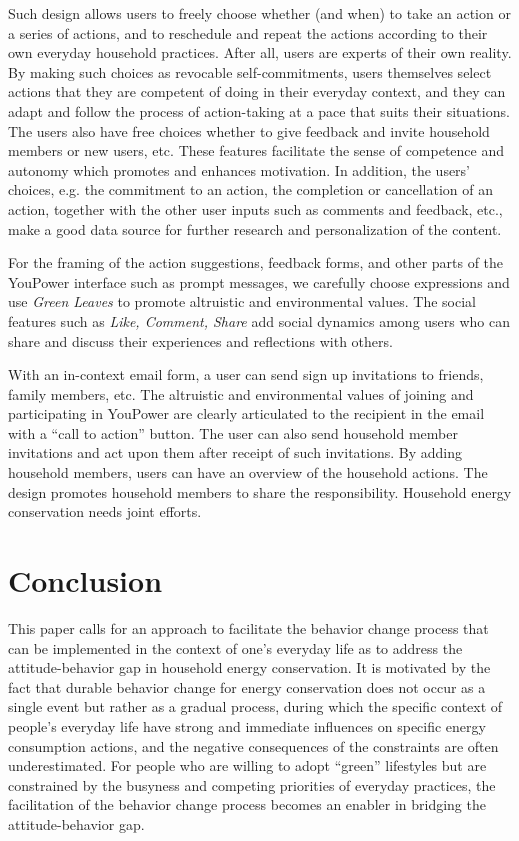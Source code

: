 \documentclass[a4paper]{article}
\begin{document}
Such design allows users to freely choose whether (and when) to take an action or a series of actions, and to reschedule and repeat the actions according to their own everyday household practices. After all, users are experts of their own reality. By making such choices as revocable self-commitments, users themselves select actions that they are competent of doing in their everyday context, and they can adapt and follow the process of action-taking at a pace that suits their situations. The users also have free choices whether to give feedback and invite household members or new users, etc. These features facilitate the sense of competence and autonomy which promotes and enhances motivation. In addition, the users' choices, e.g. the commitment to an action, the completion or cancellation of an action, together with the other user inputs such as comments and feedback, etc., make a good data source for further research and personalization of the content. 

For the framing of the action suggestions, feedback forms, and other parts of the YouPower interface such as prompt messages, we carefully choose expressions and use \textit{Green Leaves} to promote altruistic and environmental values. The social features such as \textit{Like, Comment, Share} add social dynamics among users who can share and discuss their experiences and reflections with others. 

With an in-context email form, a user can send sign up invitations to friends, family members, etc. The altruistic and environmental values of joining and participating in YouPower are clearly articulated to the recipient in the email with a ``call to action'' \citep{Crumlish2009} button. The user can also send household member invitations and act upon them after receipt of such invitations. By adding household members, users can have an overview of the household actions. The design promotes household members to share the responsibility. Household energy conservation needs joint efforts. 

\section{Conclusion}
\label{sec:conclusion}

This paper calls for an approach to facilitate the behavior change process that can be implemented in the context of one's everyday life as to address the attitude-behavior gap in household energy conservation. It is motivated by the fact that durable behavior change for energy conservation does not occur as a single event but rather as a gradual process, during which the specific context of people's everyday life have strong and immediate influences on specific energy consumption actions, and the negative consequences of the constraints are often underestimated. For people who are willing to adopt ``green'' lifestyles but are constrained by the busyness and competing priorities of everyday practices, the facilitation of the behavior change process becomes an enabler in bridging the attitude-behavior gap. 
\end{document}

